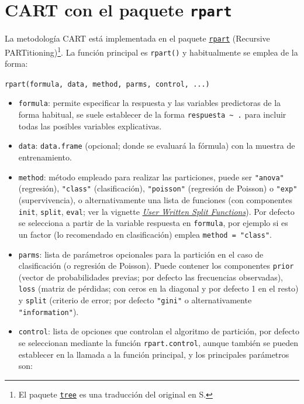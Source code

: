 \documentclass[]{book}
\theoremstyle{break}
\theoremstyle{definition}
\theoremstyle{definition}
\theoremstyle{definition}
\theoremstyle{remark}
\begin{document}
\section{\texorpdfstring{CART con el paquete
\texttt{rpart}}{CART con el paquete rpart}}\label{cart-con-el-paquete-rpart}

La metodología CART está implementada en el paquete
\href{https://CRAN.R-project.org/package=rpart}{\texttt{rpart}}
(Recursive PARTitioning)\footnote{El paquete
  \href{https://CRAN.R-project.org/package=tree}{\texttt{tree}} es una
  traducción del original en S.}. La función principal es
\texttt{rpart()} y habitualmente se emplea de la forma:

\texttt{rpart(formula,\ data,\ method,\ parms,\ control,\ ...)}

\begin{itemize}
\item
  \texttt{formula}: permite especificar la respuesta y las variables
  predictoras de la forma habitual, se suele establecer de la forma
  \texttt{respuesta\ \textasciitilde{}\ .} para incluir todas las
  posibles variables explicativas.
\item
  \texttt{data}: \texttt{data.frame} (opcional; donde se evaluará la
  fórmula) con la muestra de entrenamiento.
\item
  \texttt{method}: método empleado para realizar las particiones, puede
  ser \texttt{"anova"} (regresión), \texttt{"class"} (clasificación),
  \texttt{"poisson"} (regresión de Poisson) o \texttt{"exp"}
  (supervivencia), o alternativamente una lista de funciones (con
  componentes \texttt{init}, \texttt{split}, \texttt{eval}; ver la
  vignette
  \href{https://cran.r-project.org/web/packages/rpart/vignettes/usercode.pdf}{\emph{User
  Written Split Functions}}). Por defecto se selecciona a partir de la
  variable respuesta en \texttt{formula}, por ejemplo si es un factor
  (lo recomendado en clasificación) emplea \texttt{method\ =\ "class"}.
\item
  \texttt{parms}: lista de parámetros opcionales para la partición en el
  caso de clasificación (o regresión de Poisson). Puede contener los
  componentes \texttt{prior} (vector de probabilidades previas; por
  defecto las frecuencias observadas), \texttt{loss} (matriz de
  pérdidas; con ceros en la diagonal y por defecto 1 en el resto) y
  \texttt{split} (criterio de error; por defecto \texttt{"gini"} o
  alternativamente \texttt{"information"}).
\item
  \texttt{control}: lista de opciones que controlan el algoritmo de
  partición, por defecto se seleccionan mediante la función
  \texttt{rpart.control}, aunque también se pueden establecer en la
  llamada a la función principal, y los principales parámetros son:


\end{itemize}
\end{document}
